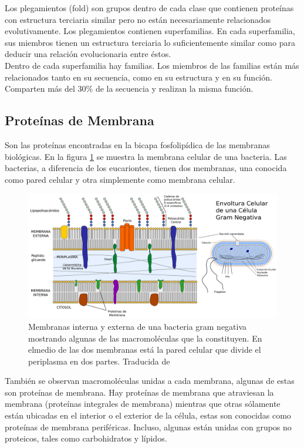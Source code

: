 Los plegamientos (fold) son grupos dentro de cada clase que contienen prote\'{i}nas con estructura terciaria similar pero no est\'{a}n necesariamente relacionados evolutivamente. Los plegamientos contienen superfamilias. En cada superfamilia, sus miembros tienen un estructura terciaria lo suficientemente similar como para deducir una relaci\'{o}n evolucionaria entre \'{e}stos.\\

Dentro de cada superfamilia hay familias. Los miembros de las familias est\'{a}n m\'{a}s relacionados tanto en su secuencia, como en su estructura y en su funci\'{o}n. Comparten m\'{a}s del $30\%$ de la secuencia y realizan la misma funci\'{o}n.

\subsection{Prote\'{i}nas de Membrana}
Son las prote\'{i}nas encontradas en la bicapa fosfolip\'{i}dica de las membranas biol\'{o}gicas. En la figura  \ref{fig:cell} se muestra la membrana 
celular de una bacteria. Las bacterias, a diferencia de los eucariontes, tienen dos membranas, una conocida como pared celular y otra simplemente como membrana celular.\\
\begin{figure}[H]
\centering
\includegraphics[scale=0.3]{Kap3/cell_wall.pdf}
\caption{Membranas interna y externa de una bacteria gram negativa mostrando algunas de las macromol\'{e}culas que la constituyen. En elmedio de las dos membranas est\'{a} la pared celular que divide el periplasma en dos partes. Traducida de \cite{Dahl2008File:Gram-}}\label{fig:cell}
\end{figure}
Tambi\'{e}n se observan macromol\'{e}culas unidas a cada membrana, algunas de estas son prote\'{i}nas de membrana. Hay prote\'{i}nas de membrana que atraviesan la membrana (prote\'{i}nas integrales de membrana) mientras que otras s\'{o}lamente est\'{a}n ubicadas en el interior o 
el exterior de la c\'{e}lula, estas son conocidas como prote\'{i}nas de membrana perif\'{e}ricas. Incluso, algunas est\'{a}n unidas con grupos no proteicos, tales como carbohidratos y l\'{i}pidos.\\

